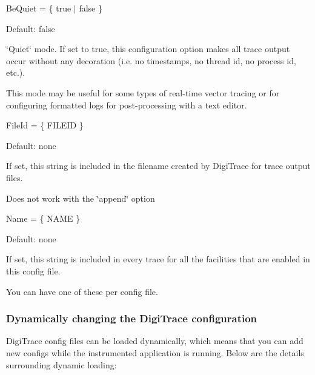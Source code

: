 \begin{DoxyItemize}
\begin{DoxyItemize}
\end{DoxyItemize}
\item {\ttfamily Be\+Quiet = \{ true $\vert$ false \} } 
\begin{DoxyItemize}
\item Default\+: {\ttfamily false}  
\item \char`\"{}\+Quiet\char`\"{} mode. If set to {\ttfamily true}, this configuration option makes all trace output occur without any decoration (i.\+e. no timestamps, no thread id, no process id, etc.).  
\item This mode may be useful for some types of real-\/time vector tracing or for configuring formatted logs for post-\/processing with a text editor.  
\end{DoxyItemize}
\item {\ttfamily File\+Id = \{ F\+I\+L\+E\+ID \} } 
\begin{DoxyItemize}
\item Default\+: none  
\item If set, this string is included in the filename created by Digi\+Trace for trace output files.  
\item Does not work with the \char`\"{}append\char`\"{} option  
\end{DoxyItemize}
\item {\ttfamily Name = \{ N\+A\+ME \} } 
\begin{DoxyItemize}
\item Default\+: none  
\item If set, this string is included in every trace for all the facilities that are enabled in this config file.  
\item You can have one of these per config file.  
\end{DoxyItemize}
\end{DoxyItemize}

\hypertarget{a00834_digitrace__advancedconfiguration__dynamicreconfiguation}{}\subsubsection{Dynamically changing the Digi\+Trace configuration}\label{a00834_digitrace__advancedconfiguration__dynamicreconfiguation}
 Digi\+Trace config files can be loaded dynamically, which means that you can add new configs while the instrumented application is running. Below are the details surrounding dynamic loading\+:

